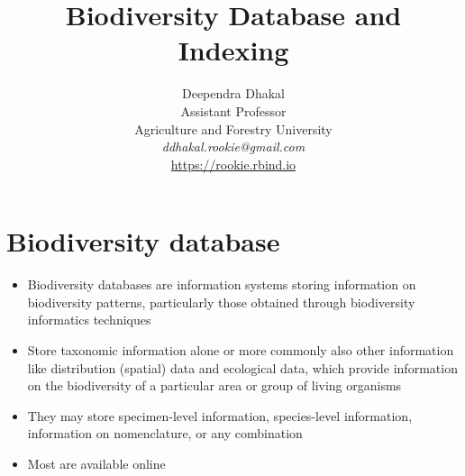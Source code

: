 \documentclass[
  ignorenonframetext,
  aspectratio=169]{beamer}
\title{Biodiversity Database and Indexing}
\author{Deependra Dhakal\\
Assistant Professor\\
Agriculture and Forestry University\\
\textit{ddhakal.rookie@gmail.com}\\
\url{https://rookie.rbind.io}}
\date{}
\providecommand{\tightlist}{%
  \setlength{\itemsep}{0pt}\setlength{\parskip}{0pt}}
\begin{document}
\frame{\titlepage}

\begin{frame}[allowframebreaks]
  \tableofcontents[hideallsubsections]
\end{frame}
\hypertarget{biodiversity-database}{%
\section{Biodiversity database}\label{biodiversity-database}}

\begin{frame}{}
\protect\hypertarget{section}{}
\begin{itemize}
\tightlist
\item
  Biodiversity databases are information systems storing information on
  biodiversity patterns, particularly those obtained through
  biodiversity informatics techniques
\item
  Store taxonomic information alone or more commonly also other
  information like distribution (spatial) data and ecological data,
  which provide information on the biodiversity of a particular area or
  group of living organisms
\item
  They may store specimen-level information, species-level information,
  information on nomenclature, or any combination
\item
  Most are available online
\end{itemize}
\end{frame}
\end{document}
